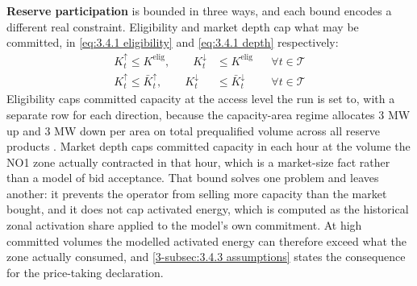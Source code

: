 \textbf{Reserve participation} is bounded in three ways, and each bound encodes a different real constraint. Eligibility and market depth cap what may be committed, in \autoref{eq:3.4.1 eligibility} and \autoref{eq:3.4.1 depth} respectively:
\begin{align}
    K^{\uparrow}_t \leq K^{\text{elig}}, \qquad K^{\downarrow}_t &\leq K^{\text{elig}} && \forall t \in \mathcal{T} \label{eq:3.4.1 eligibility} \\
    K^{\uparrow}_t \leq \bar{K}^{\uparrow}_t, \qquad K^{\downarrow}_t &\leq \bar{K}^{\downarrow}_t && \forall t \in \mathcal{T} \label{eq:3.4.1 depth}
\end{align}
Eligibility caps committed capacity at the access level the run is set to, with a separate row for each direction, because the capacity-area regime allocates 3 MW up and 3 MW down per area on total prequalified volume across all reserve products \cite{statnett_innforing_2026}. Market depth caps committed capacity in each hour at the volume the NO1 zone actually contracted in that hour, which is a market-size fact rather than a model of bid acceptance. That bound solves one problem and leaves another: it prevents the operator from selling more capacity than the market bought, and it does not cap activated energy, which is computed as the historical zonal activation share applied to the model's own commitment. At high committed volumes the modelled activated energy can therefore exceed what the zone actually consumed, and \autoref{3-subsec:3.4.3 assumptions} states the consequence for the price-taking declaration.

